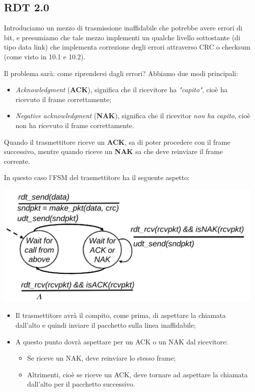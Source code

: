 \documentclass[a4paper,11pt]{article}
\begin{document}
\subsection{RDT 2.0}
Introduciamo un mezzo di trasmissione inaffidabile che potrebbe avere errori di bit, e presumiamo che tale mezzo implementi un qualche livello sottostante (di tipo data link) che implementa correzione degli errori attraverso CRC o checksum (come visto in 10.1 e 10.2).

Il problema sarà: come riprendersi dagli errori? Abbiamo due modi principali:
\begin{itemize}
	\item \textit{Acknowledgment} (\textbf{ACK}), significa che il ricevitore ha \textit{"capito"}, cioè ha ricevuto il frame correttamente;
	\item \textit{Negative acknowledgment} (\textbf{NAK}), significa che il ricevitor \textit{non ha capito}, cioè non ha ricevuto il frame correttamente.
\end{itemize}

Quando il trasmettitore riceve un \textbf{ACK}, sa di poter procedere con il frame successivo, mentre quando riceve un \textbf{NAK} sa che deve reinviare il frame corrente.

In questo caso l'FSM del trasmettitore ha il seguente aspetto:
\begin{center}
	\includegraphics[scale=0.18]{../figures/rdt2fsm.png}
\end{center}
\begin{itemize}
	\item Il trasmettitore avrà il compito, come prima, di aspettare la chiamata dall'alto e quindi inviare il pacchetto sulla linea inaffidabile;
	\item A questo punto dovrà aspettare per un ACK o un NAK dal ricevitore:
		\begin{itemize}
			\item Se riceve un NAK, deve reinviare lo stesso frame;
			\item Altrimenti, cioè se riceve un ACK, deve tornare ad aspettare la chiamata dall'alto per il pacchetto successivo. 
		\end{itemize}
\end{itemize}
\end{document}
